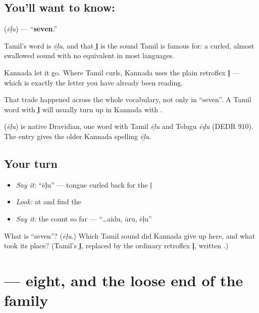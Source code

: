\subsection*{You'll want to know: }
\textbf{} (\emph{ēḷu}) — \textquotedblleft{}\textbf{seven}.\textquotedblright{}

Tamil's word is \emph{ēḻu}, and that \textbf{ḻ} is the sound Tamil is famous for: a curled, almost swallowed sound with no equivalent in most languages.

Kannada let it go. Where Tamil curls, Kannada uses the plain retroflex \textbf{ḷ} — which is exactly the letter \textbf{} you have already been reading.

That trade happened across the whole vocabulary, not only in \textquotedblleft{}seven\textquotedblright{}. A Tamil word with \textbf{ḻ} will usually turn up in Kannada with \textbf{}.

\begin{cousinweb}
\textbf{} (\emph{ēḷu}) is native Dravidian, one word with Tamil \emph{ēḻu} and Telugu \emph{ēḍu} (DEDR 910). The entry gives the older Kannada spelling \emph{ēḻu}.
\end{cousinweb}

\subsection*{Your turn}
\begin{itemize}
\raggedright
  \item \emph{Say it:} \textquotedblleft{}ēḷu\textquotedblright{} — tongue curled back for the ḷ
  \item \emph{Look:} at  and find the 
  \item \emph{Say it:} the count so far — \textquotedblleft{}…aidu, āru, ēḷu\textquotedblright{}
\end{itemize}

\begin{tcolorbox}[breakable,colback=teal!4,colframe=teal!35!black,title={Before you move on}]
What is \textquotedblleft{}seven\textquotedblright{}? (\emph{ēḷu}.) Which Tamil sound did Kannada give up here, and what took its place? (Tamil's \textbf{ḻ}, replaced by the ordinary retroflex \textbf{ḷ}, written \textbf{}.)
\end{tcolorbox}
\section[\texorpdfstring{\kn{ಎಂಟು} (eṇṭu)}{ಎಂಟು (eṇṭu)}]{ — eight, and the loose end of the family}

